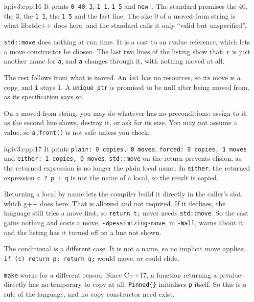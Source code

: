 \begin{solution}{iq:iv3:cpp:16}
It prints \texttt{0 40}, \texttt{3}, \texttt{1 1}, \texttt{1 5} and \texttt{new!}. The standard promises the 40, the 3, the \texttt{1 1}, the \texttt{1 5} and the last line. The size 0 of a moved-from string is what libstdc++ does here, and the standard calls it only ``valid but unspecified''.

\texttt{std::move} does nothing at run time. It is a cast to an rvalue reference, which lets a move constructor be chosen. The last two lines of the listing show that: \texttt{r} is just another name for \texttt{a}, and \texttt{a} changes through it, with nothing moved at all.

The rest follows from what is moved. An \texttt{int} has no resources, so its move is a copy, and \texttt{i} stays 1. A \texttt{unique\_ptr} is promised to be null after being moved from, as its specification says so.

On a moved-from string, you may do whatever has no preconditions: assign to it, as the second line shows, destroy it, or ask for its size. You may not assume a value, so \texttt{a.front()} is not safe unless you check.

\end{solution}

\begin{solution}{iq:iv3:cpp:17}
It prints \texttt{plain: 0 copies, 0 moves}, \texttt{forced: 0 copies, 1 moves} and \texttt{either: 1 copies, 0 moves}. \texttt{std::move} on the return prevents elision, as the returned expression is no longer the plain local name. In \texttt{either}, the returned expression \texttt{c ? p : q} is not the name of a local, so the result is copied.

Returning a local by name lets the compiler build it directly in the caller's slot, which g++ does here. That is allowed and not required. If it declines, the language still tries a move first, so \texttt{return t;} never needs \texttt{std::move}. So the cast gains nothing and costs a move. \texttt{-Wpessimizing-move}, in \texttt{-Wall}, warns about it, and the listing has it turned off on a line not shown.

The conditional is a different case. It is not a name, so no implicit move applies. \texttt{if (c) return p; return q;} would move, or could elide.

\texttt{make} works for a different reason. Since C++17, a function returning a prvalue directly has no temporary to copy at all: \texttt{Pinned\{\}} initialises \texttt{p} itself. So this is a rule of the language, and no copy constructor need exist.

\end{solution}

